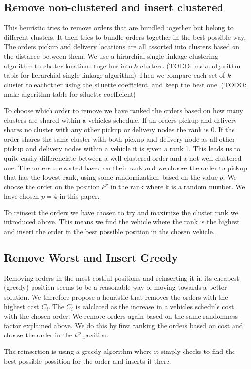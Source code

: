 \documentclass[../main.tex]{subfiles}
\begin{document}
\subsection{Remove non-clustered and insert clustered}
\label{ssec:clust}
This heuristic tries to remove orders that are bundled together but belong to different clusters. It then tries to bundle orders together in the best possible way.
The orders pickup and delivery locations are all assorted into clusters based on the distance between them. 
We use a hirarchial single linkage clustering algorithm to cluster locations together into $k$ clusters. (TODO: make algorithm table for herarchial single linkage algorithm) 
Then we compare each set of $k$ cluster to eachother using the siluette coefficient, and keep the best one. (TODO: make algorithm table for siluette coefficient) \newlinw \par
To choose which order to remove we have ranked the orders based on how many clusters are shared within a vehicles schedule.
If an orders pickup and delivery shares no cluster with any other pickup or delivery nodes the rank is 0. 
If the order shares the same cluster with both pickup and delivery node as all other pickup and delivery nodes within a vehicle it is given a rank 1.  
This leads us to quite easily differenciate between a well clustered order and a not well clustered one.
The orders are sorted based on their rank and we choose the order to pickup that has the lowest rank, using some randomization, based on the value $p$. 
We choose the order on the position $k^p$ in the rank where k is a random number. 
We have chosen $p=4$ in this paper.  \newline \par
To reinsert the orders we have chosen to try and maximize the cluster rank we introduced above. This means we find the vehicle where the rank is the highest and insert the order in the best possible position in the chosen vehicle. 

\subsection{Remove Worst and Insert Greedy}
\label{ssec:greedy}
Removing orders in the most costful positions and reinserting it in its cheapest (greedy) position seems to be a reasonable way of moving towards a better solution.
We therefore propose a heuristic that removes the orders with the highest cost $C_{i}$.
The $C_i$ is calclated as the increase in a vehicles schedule cost with the chosen order.
We remove orders again based on the same randomness factor explained above. We do this by first ranking the orders based on cost and choose the order in the $k^p$ position. \newline \par
The reinsertion is using a greedy algorithm where it simply checks to find the best possible possition for the order and inserts it there. 
\end{document}
